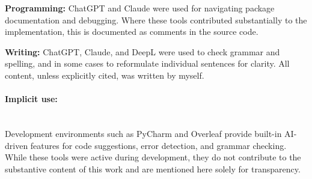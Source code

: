 \textbf{Programming:} ChatGPT and Claude were used for navigating package
documentation and debugging. Where these tools contributed substantially to the
implementation, this is documented as comments in the source code.

\textbf{Writing:} ChatGPT, Claude, and DeepL were used to check grammar and
spelling, and in some cases to reformulate individual sentences for clarity.
All content, unless explicitly cited, was written by myself.

\paragraph{Implicit use:}\mbox{}\\

Development environments such as PyCharm and Overleaf provide built-in
AI-driven features for code suggestions, error detection, and grammar
checking. While these tools were active during development, they do not
contribute to the substantive content of this work and are mentioned here
solely for transparency.
